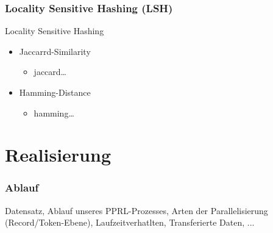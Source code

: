 \documentclass{beamer}
\begin{document}
    \begin{frame}
        \frametitle{Locality Sensitive Hashing (LSH)}
            Locality Sensitive Hashing
            \begin{itemize}
                \item Jaccarrd-Similarity
                    \begin{itemize}
                        \item jaccard\ldots
                    \end{itemize}
                \item Hamming-Distance
                    \begin{itemize}
                        \item hamming\ldots
                    \end{itemize}
            \end{itemize}
    \end{frame}
    \section[Section]{Realisierung}
    \begin{frame}
    		\frametitle{Ablauf}
    		Datensatz,
         Ablauf unseres PPRL-Prozesses,
         Arten der Parallelisierung (Record/Token-Ebene),
         Laufzeitverhatlten,
         Transferierte Daten,
         ...
    \end{frame}
    
\end{document}
